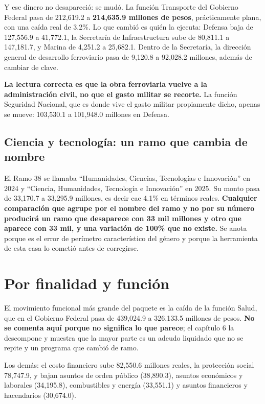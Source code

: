 Y ese dinero no desapareció: se mudó. La función Transporte del Gobierno Federal
pasa de 212,619.2 a \textbf{214,635.9 millones de pesos}, prácticamente plana, con
una caída real de 3.2\%. Lo que cambió es quién la ejecuta: Defensa baja de
127,556.9 a 41,772.1, la Secretaría de Infraestructura sube de 80,811.1 a
147,181.7, y Marina de 4,251.2 a 25,682.1. Dentro de la Secretaría, la dirección
general de desarrollo ferroviario pasa de 9,120.8 a 92,028.2 millones, además de
cambiar de clave.

\textbf{La lectura correcta es que la obra ferroviaria vuelve a la administración
civil, no que el gasto militar se recorte.} La función Seguridad Nacional, que es
donde vive el gasto militar propiamente dicho, apenas se mueve: 103,530.1 a
101,948.0 millones en Defensa.

\subsection{Ciencia y tecnología: un ramo que cambia de nombre}

El Ramo 38 se llamaba ``Humanidades, Ciencias, Tecnologías e Innovación'' en 2024
y ``Ciencia, Humanidades, Tecnología e Innovación'' en 2025. Su monto pasa de
33,170.7 a 33,295.9 millones, es decir cae 4.1\% en términos reales.
\textbf{Cualquier comparación que agrupe por el nombre del ramo y no por su número
producirá un ramo que desaparece con 33 mil millones y otro que aparece con 33
mil, y una variación de 100\% que no existe.} Se anota porque es el error de
perímetro característico del género y porque la herramienta de esta casa lo
cometió antes de corregirse.

\section{Por finalidad y función}



El movimiento funcional más grande del paquete es la caída de la función Salud,
que en el Gobierno Federal pasa de 439,024.9 a 326,133.5 millones de pesos.
\textbf{No se comenta aquí porque no significa lo que parece}; el capítulo 6 la
descompone y muestra que la mayor parte es un adeudo liquidado que no se repite y
un programa que cambió de ramo.

Los demás: el costo financiero sube 82,550.6 millones reales, la protección social
78,747.9, y bajan asuntos de orden público (38,890.3), asuntos económicos y
laborales (34,195.8), combustibles y energía (33,551.1) y asuntos financieros y
hacendarios (30,674.0).

